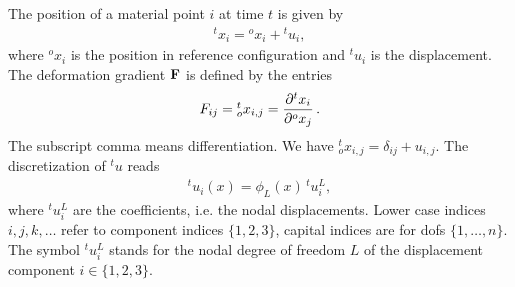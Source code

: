 The position of a material point $i$ at time $t$ is given by
\begin{equation*}
  \begin{array}{lll}
    {}^tx_i = {}^ox_i + {}^tu_i,
  \end{array}
\end{equation*}
where ${}^ox_i$ is the position in reference configuration and ${}^tu_i$ is the displacement. The deformation gradient $\textbf{F}$ is defined by the entries
\begin{equation*}
  \begin{array}{lll}
    F_{ij} = {}^t_ox_{i,j} = \p{{}^tx_i}{{}^ox_j}.
  \end{array}
\end{equation*}
The subscript comma means differentiation. We have ${}^t_ox_{i,j} = \delta_{ij} + u_{i,j}$. 
The discretization of $^{t}u$ reads
\begin{equation*}
  \begin{array}{lll}
    {}^tu_i(x) = \phi_L(x)\,{}^tu_i^L,
  \end{array}
\end{equation*}
where ${}^tu_i^L$ are the coefficients, i.e. the nodal displacements. Lower case indices $i,j,k,\dots$ refer to component indices $\{1,2,3\}$, capital indices are for dofs $\{1,\dots,n\}$. 
The symbol ${}^tu_i^L$ stands for the nodal degree of freedom $L$ of the displacement component $i\in \{1,2,3\}$.


